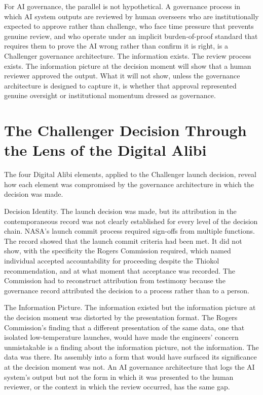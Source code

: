 For AI governance, the parallel is not hypothetical. A governance process in which AI system outputs are reviewed by human overseers who are institutionally expected to approve rather than challenge, who face time pressure that prevents genuine review, and who operate under an implicit burden-of-proof standard that requires them to prove the AI wrong rather than confirm it is right, is a Challenger governance architecture. The information exists. The review process exists. The information picture at the decision moment will show that a human reviewer approved the output. What it will not show, unless the governance architecture is designed to capture it, is whether that approval represented genuine oversight or institutional momentum dressed as governance.

\scenebreak

\section{The Challenger Decision Through the Lens of the Digital Alibi}

The four Digital Alibi elements, applied to the Challenger launch decision, reveal how each element was compromised by the governance architecture in which the decision was made.

Decision Identity. The launch decision was made, but its attribution in the contemporaneous record was not clearly established for every level of the decision chain. NASA's launch commit process required sign-offs from multiple functions. The record showed that the launch commit criteria had been met. It did not show, with the specificity the Rogers Commission required, which named individual accepted accountability for proceeding despite the Thiokol recommendation, and at what moment that acceptance was recorded. The Commission had to reconstruct attribution from testimony because the governance record attributed the decision to a process rather than to a person.

The Information Picture. The information existed but the information picture at the decision moment was distorted by the presentation format. The Rogers Commission's finding that a different presentation of the same data, one that isolated low-temperature launches, would have made the engineers' concern unmistakable is a finding about the information picture, not the information. The data was there. Its assembly into a form that would have surfaced its significance at the decision moment was not. An AI governance architecture that logs the AI system's output but not the form in which it was presented to the human reviewer, or the context in which the review occurred, has the same gap.

